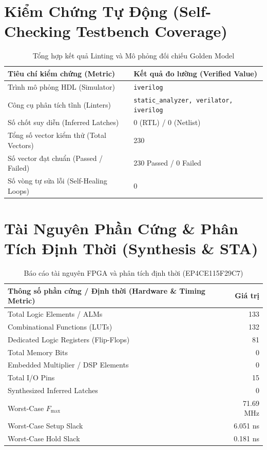 \documentclass[11pt,a4paper]{article}
\begin{document}
\section{Kiểm Chứng Tự Động (Self-Checking Testbench Coverage)}
\begin{table}[H]
    \centering
    \small
    \caption{Tổng hợp kết quả Linting và Mô phỏng đối chiếu Golden Model}
    \begin{tabularx}{\textwidth}{@{}lX@{}}
        \toprule
        \textbf{Tiêu chí kiểm chứng (Metric)} & \textbf{Kết quả đo lường (Verified Value)} \\
        \midrule
        Trình mô phỏng HDL (Simulator) & \texttt{iverilog} \\
        Công cụ phân tích tĩnh (Linters) & \texttt{static\_analyzer, verilator, iverilog} \\
        Số chốt suy diễn (Inferred Latches) & 0 (RTL) / 0 (Netlist) \\
        Tổng số vector kiểm thử (Total Vectors) & 230 \\
        Số vector đạt chuẩn (Passed / Failed) & 230 Passed / 0 Failed \\
        Số vòng tự sửa lỗi (Self-Healing Loops) & 0 \\
        \bottomrule
    \end{tabularx}
\end{table}

\section{Tài Nguyên Phần Cứng \& Phân Tích Định Thời (Synthesis \& STA)}
\begin{table}[H]
    \centering
    \small
    \caption{Báo cáo tài nguyên FPGA và phân tích định thời (EP4CE115F29C7)}
    \begin{tabularx}{\textwidth}{@{}Xr@{}}
        \toprule
        \textbf{Thông số phần cứng / Định thời (Hardware \& Timing Metric)} & \textbf{Giá trị} \\
        \midrule
        Total Logic Elements / ALMs & 133 \\
        Combinational Functions (LUTs) & 132 \\
        Dedicated Logic Registers (Flip-Flops) & 81 \\
        Total Memory Bits & 0 \\
        Embedded Multiplier / DSP Elements & 0 \\
        Total I/O Pins & 15 \\
        Synthesized Inferred Latches & 0 \\
        Worst-Case $F_{\max}$ & 71.69 MHz \\
        Worst-Case Setup Slack & 6.051 ns \\
        Worst-Case Hold Slack & 0.181 ns \\
        \bottomrule
    \end{tabularx}
\end{table}
\end{document}

